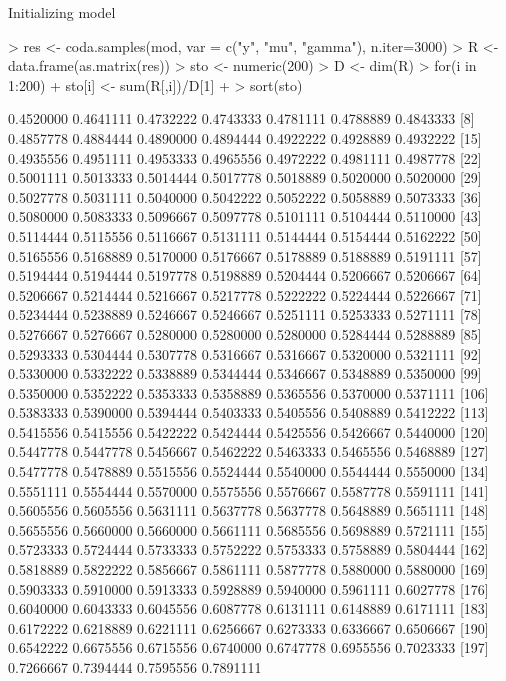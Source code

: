 \documentclass{article}
\begin{document}
\begin{Schunk}
\begin{Soutput}
Initializing model
\end{Soutput}
\begin{Sinput}
> res <- coda.samples(mod, var = c("y", "mu", "gamma"), n.iter=3000)
> R <- data.frame(as.matrix(res))
> sto <- numeric(200)
> D <- dim(R)
> for(i in 1:200){
+   sto[i] <- sum(R[,i])/D[1]
+ }
> sort(sto)
\end{Sinput}
\begin{Soutput}
  [1] 0.4520000 0.4641111 0.4732222 0.4743333 0.4781111 0.4788889 0.4843333
  [8] 0.4857778 0.4884444 0.4890000 0.4894444 0.4922222 0.4928889 0.4932222
 [15] 0.4935556 0.4951111 0.4953333 0.4965556 0.4972222 0.4981111 0.4987778
 [22] 0.5001111 0.5013333 0.5014444 0.5017778 0.5018889 0.5020000 0.5020000
 [29] 0.5027778 0.5031111 0.5040000 0.5042222 0.5052222 0.5058889 0.5073333
 [36] 0.5080000 0.5083333 0.5096667 0.5097778 0.5101111 0.5104444 0.5110000
 [43] 0.5114444 0.5115556 0.5116667 0.5131111 0.5144444 0.5154444 0.5162222
 [50] 0.5165556 0.5168889 0.5170000 0.5176667 0.5178889 0.5188889 0.5191111
 [57] 0.5194444 0.5194444 0.5197778 0.5198889 0.5204444 0.5206667 0.5206667
 [64] 0.5206667 0.5214444 0.5216667 0.5217778 0.5222222 0.5224444 0.5226667
 [71] 0.5234444 0.5238889 0.5246667 0.5246667 0.5251111 0.5253333 0.5271111
 [78] 0.5276667 0.5276667 0.5280000 0.5280000 0.5280000 0.5284444 0.5288889
 [85] 0.5293333 0.5304444 0.5307778 0.5316667 0.5316667 0.5320000 0.5321111
 [92] 0.5330000 0.5332222 0.5338889 0.5344444 0.5346667 0.5348889 0.5350000
 [99] 0.5350000 0.5352222 0.5353333 0.5358889 0.5365556 0.5370000 0.5371111
[106] 0.5383333 0.5390000 0.5394444 0.5403333 0.5405556 0.5408889 0.5412222
[113] 0.5415556 0.5415556 0.5422222 0.5424444 0.5425556 0.5426667 0.5440000
[120] 0.5447778 0.5447778 0.5456667 0.5462222 0.5463333 0.5465556 0.5468889
[127] 0.5477778 0.5478889 0.5515556 0.5524444 0.5540000 0.5544444 0.5550000
[134] 0.5551111 0.5554444 0.5570000 0.5575556 0.5576667 0.5587778 0.5591111
[141] 0.5605556 0.5605556 0.5631111 0.5637778 0.5637778 0.5648889 0.5651111
[148] 0.5655556 0.5660000 0.5660000 0.5661111 0.5685556 0.5698889 0.5721111
[155] 0.5723333 0.5724444 0.5733333 0.5752222 0.5753333 0.5758889 0.5804444
[162] 0.5818889 0.5822222 0.5856667 0.5861111 0.5877778 0.5880000 0.5880000
[169] 0.5903333 0.5910000 0.5913333 0.5928889 0.5940000 0.5961111 0.6027778
[176] 0.6040000 0.6043333 0.6045556 0.6087778 0.6131111 0.6148889 0.6171111
[183] 0.6172222 0.6218889 0.6221111 0.6256667 0.6273333 0.6336667 0.6506667
[190] 0.6542222 0.6675556 0.6715556 0.6740000 0.6747778 0.6955556 0.7023333
[197] 0.7266667 0.7394444 0.7595556 0.7891111

\end{Soutput}
\end{Schunk}
\end{document}
